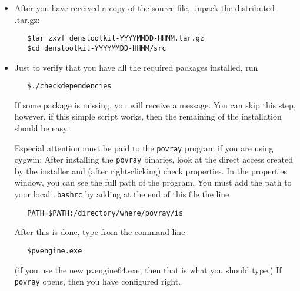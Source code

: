 \begin{itemize}
\item After you have received a copy of the source file, unpack the distributed .tar.gz:
\begin{verbatim}
   $tar zxvf denstoolkit-YYYYMMDD-HHMM.tar.gz
   $cd denstoolkit-YYYYMMDD-HHMM/src
\end{verbatim}
\item Just to verify that you have all the required packages installed, run
\begin{verbatim}
   $./checkdependencies
\end{verbatim}
 If some package is missing, you will receive a message. You can skip this step, however, if this simple script works, then the remaining of the installation should be easy.
 
 Especial attention must be paid to the \texttt{povray} program if you are using cygwin: After installing the \texttt{povray} binaries, look at the direct access created by the installer and (after right-clicking) check properties. In the properties window, you can see the full path of the program. You must add the path to your local \texttt{.bashrc} by adding at the end of this file the line
\begin{verbatim}
   PATH=$PATH:/directory/where/povray/is
\end{verbatim}
After this is done, type from the command line
\begin{verbatim}
   $pvengine.exe
\end{verbatim}
(if you use the new pvengine64.exe, then that is what you should type.) If \texttt{povray} opens, then you have configured right.


\end{itemize}
